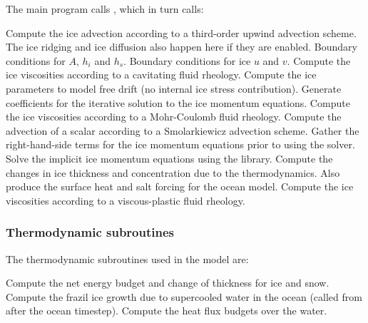The main program calls , which in turn calls:
\begin{klist}
    Compute the ice advection according to a
third-order upwind advection scheme. The ice ridging and ice diffusion
also happen here if they are enabled.
    Boundary conditions for $A$, $h_i$ and $h_s$.
    Boundary conditions for ice $u$ and $v$.
    Compute the ice viscosities according to a
cavitating fluid rheology.
   Compute the ice parameters to model free
drift (no internal ice stress contribution).
    Generate coefficients for the iterative
solution to the ice momentum equations.
    Compute the ice viscosities according to a
Mohr-Coulomb fluid rheology.
    Compute the advection of a scalar according to
a Smolarkiewicz advection scheme.
    Gather the right-hand-side terms for the ice
momentum equations prior to using the solver.
    Solve the implicit ice momentum equations
using the  library.
    Compute the changes in ice thickness and
concentration due to the thermodynamics.  Also produce the surface heat
and salt forcing for the ocean model.
    Compute the ice viscosities according to a
viscous-plastic fluid rheology.
\end{klist}

\subsubsection{Thermodynamic subroutines}
The thermodynamic subroutines used in the model are:
\begin{klist}
    Compute the net energy budget and change of
thickness for ice and snow.
    Compute the frazil ice growth due to supercooled
water in the ocean (called from  after the ocean timestep).
       Compute the heat flux budgets over the water.
\end{klist}

